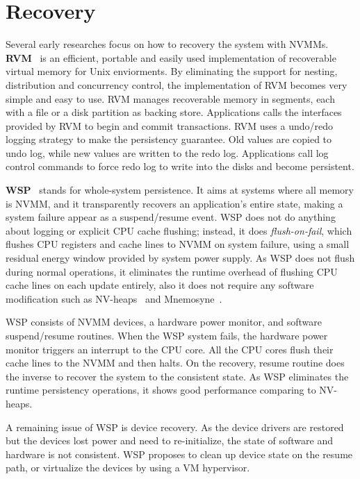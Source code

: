 \section{Recovery} 
\label{sec:recovery}

Several early researches focus on how to recovery the system with NVMMs.
\textbf{RVM}~\cite{RVM} is an efficient,
 portable and easily used implementation of
recoverable virtual memory for Unix enviorments. By eliminating the support
for nesting, distribution and concurrency control, the implementation of 
RVM becomes very simple and easy to use. RVM manages recoverable memory in
segments, each with a file or a disk partition as backing store. Applications
calls the interfaces provided by RVM to begin and commit transactions. RVM
uses a undo/redo logging strategy to make the persistency guarantee. Old values
are copied to undo log, while new values are written to the redo log. Applications call log control commands to force redo log to write into the disks
and become persistent.

\textbf{WSP}~\cite{WSP} stands for whole-system persistence.
 It aims at systems where
all memory is NVMM, and it transparently recovers an application's entire state,
making a system failure appear as a suspend/resume event. WSP does not
do anything about logging or explicit CPU cache flushing; instead, it does 
\emph{flush-on-fail}, which flushes CPU registers and cache lines to NVMM
on system failure, using a small residual energy window provided by system
power supply. As WSP does not flush during normal operations, it eliminates
the runtime overhead of flushing CPU cache lines on each update entirely, also
it does not require any software modification such as NV-heaps~\cite{nvheaps}
 and Mnemosyne~\cite{mnemosyne}.

WSP consists of NVMM devices, a hardware power monitor, and software suspend/resume routines. When the WSP system fails, the hardware power monitor triggers
an interrupt to the CPU core. All the CPU cores flush their cache lines to the 
NVMM and then halts. On the recovery, resume routine does the inverse to recover
the system to the consistent state. As WSP eliminates the runtime persistency
operations, it shows good performance comparing to NV-heaps.

A remaining issue of WSP is device recovery. As the device drivers are restored
but the devices lost power and need to re-initialize, the state of software
and hardware is not consistent. WSP proposes to clean up device state on
the resume path, or virtualize the devices by using a VM hypervisor.


